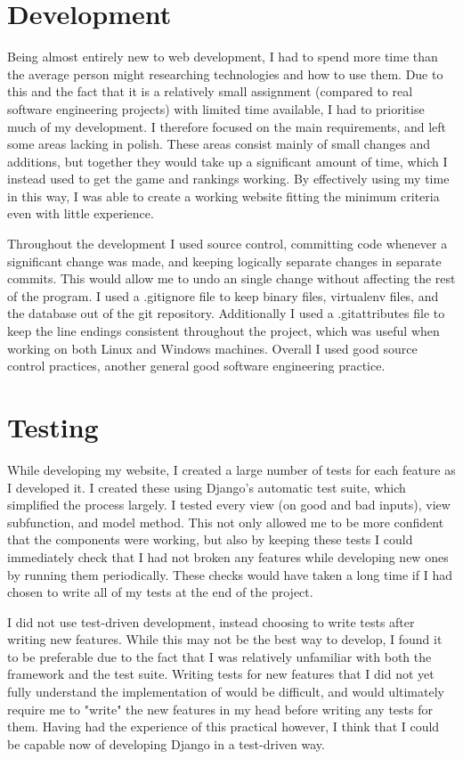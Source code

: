 \documentclass{article}
\begin{document}
\section{Development}

Being almost entirely new to web development, I had to spend more time than the average person might researching technologies and how to use them. Due to this and the fact that it is a relatively small assignment (compared to real software engineering projects) with limited time available, I had to prioritise much of my development. I therefore focused on the main requirements, and left some areas lacking in polish. These areas consist mainly of small changes and additions, but together they would take up a significant amount of time, which I instead used to get the game and rankings working. By effectively using my time in this way, I was able to create a working website fitting the minimum criteria even with little experience.

Throughout the development I used source control, committing code whenever a significant change was made, and keeping logically separate changes in separate commits. This would allow me to undo an single change without affecting the rest of the program. I used a .gitignore file to keep binary files, virtualenv files, and the database out of the git repository. Additionally I used a .gitattributes file to keep the line endings consistent throughout the project, which was useful when working on both Linux and Windows machines. Overall I used good source control practices, another general good software engineering practice.

\section{Testing}

While developing my website, I created a large number of tests for each feature as I developed it. I created these using Django's automatic test suite, which simplified the process largely. I tested every view (on good and bad inputs), view subfunction, and model method. This not only allowed me to be more confident that the components were working, but also by keeping these tests I could immediately check that I had not broken any features while developing new ones by running them periodically. These checks would have taken a long time if I had chosen to write all of my tests at the end of the project.

I did not use test-driven development, instead choosing to write tests after writing new features. While this may not be the best way to develop, I found it to be preferable due to the fact that I was relatively unfamiliar with both the framework and the test suite. Writing tests for new features that I did not yet fully understand the implementation of would be difficult, and would ultimately require me to "write" the new features in my head before writing any tests for them. Having had the experience of this practical however, I think that I could be capable now of developing Django in a test-driven way.
\end{document}
